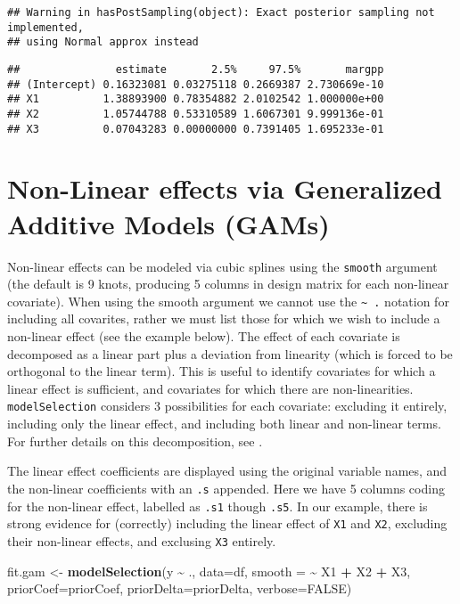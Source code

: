 \documentclass[
]{book}
\newenvironment{Shaded}{\begin{snugshade}}{\end{snugshade}}
\newcommand{\AttributeTok}[1]{\textcolor[rgb]{0.13,0.29,0.53}{#1}}
\newcommand{\ConstantTok}[1]{\textcolor[rgb]{0.56,0.35,0.01}{#1}}
\newcommand{\FunctionTok}[1]{\textcolor[rgb]{0.13,0.29,0.53}{\textbf{#1}}}
\newcommand{\NormalTok}[1]{#1}
\newcommand{\OtherTok}[1]{\textcolor[rgb]{0.56,0.35,0.01}{#1}}
\newcommand{\SpecialCharTok}[1]{\textcolor[rgb]{0.81,0.36,0.00}{\textbf{#1}}}
\theoremstyle{definition}
\theoremstyle{definition}
\theoremstyle{definition}
\theoremstyle{definition}
\theoremstyle{remark}
\begin{document}
\begin{verbatim}
## Warning in hasPostSampling(object): Exact posterior sampling not implemented,
## using Normal approx instead
\end{verbatim}

\begin{verbatim}
##               estimate       2.5%     97.5%       margpp
## (Intercept) 0.16323081 0.03275118 0.2669387 2.730669e-10
## X1          1.38893900 0.78354882 2.0102542 1.000000e+00
## X2          1.05744788 0.53310589 1.6067301 9.999136e-01
## X3          0.07043283 0.00000000 0.7391405 1.695233e-01
\end{verbatim}

\section{Non-Linear effects via Generalized Additive Models (GAMs)}\label{non-linear-effects-via-generalized-additive-models-gams}

Non-linear effects can be modeled via cubic splines using the \texttt{smooth} argument (the default is 9 knots, producing 5 columns in design matrix for each non-linear covariate).
When using the smooth argument we cannot use the \texttt{\textasciitilde{}\ .} notation for including all covarites, rather we must list those for which we wish to include a non-linear effect (see the example below).
The effect of each covariate is decomposed as a linear part plus a deviation from linearity (which is forced to be orthogonal to the linear term). This is useful to identify covariates for which a linear effect is sufficient, and covariates for which there are non-linearities.
\texttt{modelSelection} considers 3 possibilities for each covariate: excluding it entirely, including only the linear effect, and including both linear and non-linear terms. For further details on this decomposition, see \citep{rossell:2021b}.

The linear effect coefficients are displayed using the original variable names, and the non-linear coefficients with an \texttt{.s} appended. Here we have 5 columns coding for the non-linear effect, labelled as \texttt{.s1} though \texttt{.s5}.
In our example, there is strong evidence for (correctly) including the linear effect of \texttt{X1} and \texttt{X2}, excluding their non-linear effects, and exclusing \texttt{X3} entirely.

\begin{Shaded}
\begin{Highlighting}[]
\NormalTok{fit.gam }\OtherTok{\textless{}{-}} \FunctionTok{modelSelection}\NormalTok{(y }\SpecialCharTok{\textasciitilde{}}\NormalTok{ ., }\AttributeTok{data=}\NormalTok{df,}
                     \AttributeTok{smooth =} \SpecialCharTok{\textasciitilde{}}\NormalTok{ X1 }\SpecialCharTok{+}\NormalTok{ X2 }\SpecialCharTok{+}\NormalTok{ X3,}
                     \AttributeTok{priorCoef=}\NormalTok{priorCoef,}
                     \AttributeTok{priorDelta=}\NormalTok{priorDelta, }\AttributeTok{verbose=}\ConstantTok{FALSE}\NormalTok{)}
\end{Highlighting}
\end{Shaded}
\end{document}
